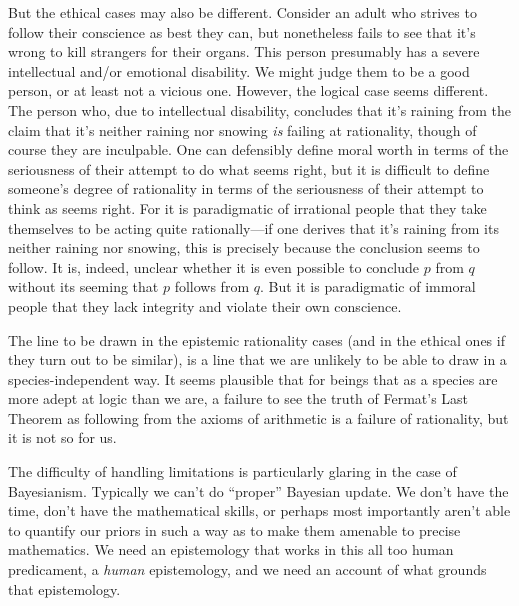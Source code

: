 But the ethical cases may also be different. Consider an adult who strives to follow their conscience as best they can,
but nonetheless fails to see that it's wrong to kill strangers for their organs. This person presumably has
a severe intellectual and/or emotional disability. We might judge them to be a good person, or at least not a vicious one. 
However, the logical case seems different. The person who, due to intellectual disability, concludes that it's raining 
from the claim that it's neither raining nor snowing \textit{is} failing at rationality, though of course they are 
inculpable. One can defensibly define moral worth in terms of the seriousness of their attempt to do what seems right, but
it is difficult to define someone's degree of rationality in terms of the seriousness of their attempt to think as seems
right. For it is paradigmatic of irrational people that they take themselves to be acting quite rationally---if one
derives that it's raining from its neither raining nor snowing, this is precisely because the conclusion seems to follow.
It is, indeed, unclear whether it is even possible to conclude $p$ from $q$ without its seeming that $p$ follows from $q$.
But it is paradigmatic of immoral people that they lack integrity and violate their own conscience. 

The line to be drawn in the epistemic rationality cases (and in the ethical ones if they turn out to be similar), is a line that we 
are unlikely to be able to draw in a species-independent way. It seems plausible that for beings that as a species are 
more adept at logic than we are, a failure to see the truth of Fermat's Last Theorem as following from the axioms of
arithmetic is a failure of rationality, but it is not so for us. 

The difficulty of handling limitations is particularly glaring in the case of Bayesianism. Typically 
we can't do ``proper'' Bayesian update. We don't have the time, don't have the mathematical skills, or perhaps most importantly aren't 
able to quantify our priors in such a way as to make them amenable to precise mathematics. We need an epistemology that 
works in this all too human predicament, a \textit{human} epistemology, and we need an account of what grounds that 
epistemology. 

